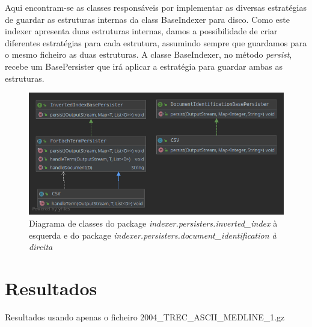 \documentclass[12pt]{article}
\begin{document}
Aqui encontram-se as classes responsáveis por implementar as diversas
estratégias de guardar as estruturas internas da class BaseIndexer
para disco. Como este indexer apresenta duas estruturas internas,
damos a possibilidade de criar diferentes estratégias para cada
estrutura, assumindo sempre que guardamos para o mesmo ficheiro as
duas estruturas. A classe BaseIndexer, no método {\it persist},
recebe um BasePersister que irá aplicar a estratégia para guardar
ambas as estruturas.

\begin{figure}[h]
  \center
  \includegraphics[width=16cm]{packages_indexer_persisters_impl.png}
  \caption{Diagrama de classes do package {\it indexer.persisters.inverted\_index}
  à esquerda e do package \it indexer.persisters.document\_identification
  à direita}
\end{figure}

\newpage

\section{Resultados}

Resultados usando apenas o ficheiro 2004\_TREC\_ASCII\_MEDLINE\_1.gz \\
\end{document}

